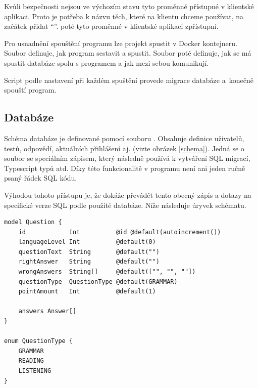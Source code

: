Kvůli bezpečnosti nejsou ve výchozím stavu tyto proměnné přístupné v klientské aplikaci. Proto je potřeba k názvu těch, které na klientu chceme používat, na začátek přidat \enquote{}.  poté tyto proměnné v klientské aplikaci zpřístupní.

Pro usnadnění spouštění programu lze projekt spustit v Docker kontejneru. Soubor  definuje, jak program sestavit a spustit. Soubor  poté definuje, jak se má spustit databáze spolu s programem a jak mezi sebou komunikují. \cite{docker}

Script  podle nastavení při každém spuštění provede migrace databáze a~konečně spouští program.

\subsection{Databáze}

Schéma databáze je definované pomocí souboru . Obsahuje definice uživatelů, testů, odpovědí, aktuálních přihlášení aj. (vizte obrázek \ref{schema}). Jedná se o soubor se speciálním zápisem, který následně  používá k vytváření SQL migrací, Typescript typů atd. Díky této funkcionalitě v programu není ani jeden ručně psaný řádek SQL kódu.

Výhodou tohoto přístupu je, že  dokáže převádět tento obecný zápis a dotazy na specifické verze SQL podle použité databáze. \cite{prisma} Níže následuje úryvek schématu.

\begin{lstlisting}[language=Prisma, caption={Úryvek schématu databáze}]
model Question {
    id            Int          @id @default(autoincrement())
    languageLevel Int          @default(0)
    questionText  String       @default("")
    rightAnswer   String       @default("")
    wrongAnswers  String[]     @default(["", "", ""])
    questionType  QuestionType @default(GRAMMAR)
    pointAmount   Int          @default(1)

    answers Answer[]
}

enum QuestionType {
    GRAMMAR
    READING
    LISTENING
}
\end{lstlisting}


